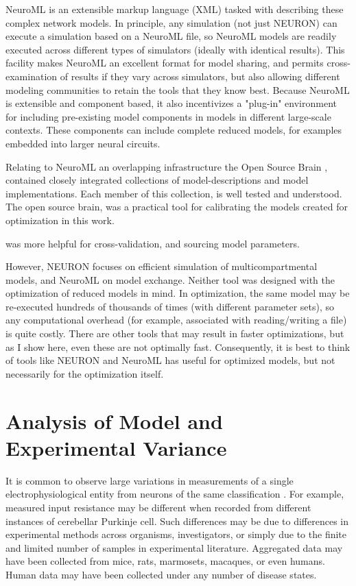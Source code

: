 NeuroML \cite{gleeson2010neuroml} is an extensible markup language (XML) tasked with describing these complex network models.
In principle, any simulation (not just NEURON) can execute a simulation based on a NeuroML file, so NeuroML models are readily executed across different types of simulators (ideally with identical results).
This facility makes NeuroML an excellent format for model sharing, and permits cross-examination of results if they vary across simulators, but also allowing different modeling communities to retain the tools that they know best.
Because NeuroML is extensible and component based, it also incentivizes a "plug-in" environment for including pre-existing model components in models in different large-scale contexts.
These components can include complete reduced models, for examples embedded into larger neural circuits.

Relating to NeuroML an overlapping infrastructure the Open Source Brain \cite{gleeson2019open}, contained closely integrated collections of model-descriptions and model implementations. Each member of this collection, is well tested and understood. The open source brain, was a practical tool for calibrating the models created for optimization in this work.


was more helpful for cross-validation, and sourcing model parameters.

However, NEURON focuses on efficient simulation of multicompartmental models, and NeuroML on model exchange. 
Neither tool was designed with the optimization of reduced models in mind.
In optimization, the same model may be re-executed hundreds of thousands of times (with different parameter sets), so any computational overhead (for example, associated with reading/writing a file) is quite costly.  
There are other tools that may result in faster optimizations, but as I show here, even these are not optimally fast.
Consequently, it is best to think of tools like NEURON and NeuroML has useful for optimized models, but not necessarily for the optimization itself.  

\section{Analysis of Model and Experimental Variance}
It is common to observe large variations in measurements of a single electrophysiological entity from neurons of the same classification \cite{tripathy2014neuroelectro}.
For example, measured input resistance may be different when recorded from different instances of cerebellar Purkinje cell.
Such differences may be due to differences in experimental methods across organisms, investigators, or simply due to the finite and limited number of samples in experimental literature.  
Aggregated data may have been collected from mice, rats, marmosets, macaques, or even humans.
Human data may have been collected under any number of disease states.

